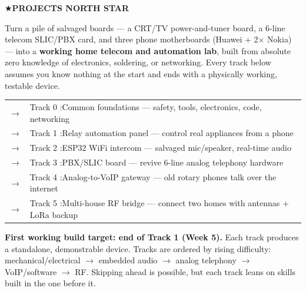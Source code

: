 \label{sec:projectsnorthstar}
\vspace{0.4cm}
\begin{northstarbox}
\textbf{\color{arlizblue}\large $\bigstar$\enspace PROJECTS NORTH STAR}

\vspace{6pt}
Turn a pile of salvaged boards --- a CRT/TV power-and-tuner board, a 6-line telecom
SLIC/PBX card, and three phone motherboards (Huawei + 2$\times$ Nokia) --- into a
\textbf{working home telecom and automation lab}, built from absolute zero knowledge
of electronics, soldering, or networking. Every track below assumes you know nothing
at the start and ends with a physically working, testable device.

\vspace{8pt}
\begin{tabular}{@{\hspace{4pt}}ll}
  \textbf{\color{arlizblue}$\to$} & Track 0\phantom{00} :\enspace Common foundations --- safety, tools, electronics, code, networking \\
  \textbf{\color{arlizblue}$\to$} & Track 1\phantom{00} :\enspace Relay automation panel --- control real appliances from a phone \\
  \textbf{\color{arlizblue}$\to$} & Track 2\phantom{00} :\enspace ESP32 WiFi intercom --- salvaged mic/speaker, real-time audio \\
  \textbf{\color{arlizblue}$\to$} & Track 3\phantom{00} :\enspace PBX/SLIC board --- revive 6-line analog telephony hardware \\
  \textbf{\color{arlizblue}$\to$} & Track 4\phantom{00} :\enspace Analog-to-VoIP gateway --- old rotary phones talk over the internet \\
  \textbf{\color{arlizblue}$\to$} & Track 5\phantom{00} :\enspace Multi-house RF bridge --- connect two homes with antennas + LoRa backup \\
\end{tabular}

\vspace{8pt}
\textbf{\color{arlizgold}First working build target: end of Track 1 (Week 5).}
Each track produces a standalone, demonstrable device. Tracks are ordered by rising
difficulty: mechanical/electrical $\to$ embedded audio $\to$ analog telephony $\to$
VoIP/software $\to$ RF. Skipping ahead is possible, but each track leans on skills
built in the one before it.
\end{northstarbox}

